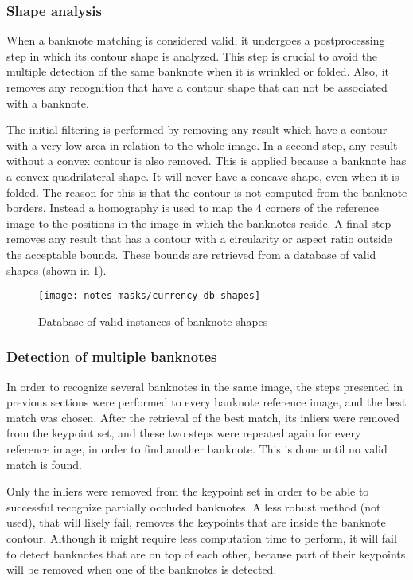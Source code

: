 \subsubsection{Shape analysis}\label{sec:shape-analysis}

When a banknote matching is considered valid, it undergoes a postprocessing step in which its contour shape is analyzed. This step is crucial to avoid the multiple detection of the same banknote when it is wrinkled or folded. Also, it removes any recognition that have a contour shape that can not be associated with a banknote.

The initial filtering is performed by removing any result which have a contour with a very low area in relation to the whole image. In a second step, any result without a convex contour is also removed. This is applied because a banknote has a convex quadrilateral shape. It will never have a concave shape, even when it is folded. The reason for this is that the contour is not computed from the banknote borders. Instead a homography is used to map the 4 corners of the reference image to the positions in the image in which the banknotes reside. A final step removes any result that has a contour with a circularity or aspect ratio outside the acceptable bounds. These bounds are retrieved from a database of valid shapes (shown in \cref{fig:currency-db-shapes}).

\begin{figure}
	\centering
	\texttt{[image: notes-masks/currency-db-shapes]}
	\caption{Database of valid instances of banknote shapes}
	\label{fig:currency-db-shapes}
\end{figure}


\subsubsection{Detection of multiple banknotes}

In order to recognize several banknotes in the same image, the steps presented in previous sections were performed to every banknote reference image, and the best match was chosen. After the retrieval of the best match, its inliers were removed from the keypoint set, and these two steps were repeated again for every reference image, in order to find another banknote. This is done until no valid match is found.

Only the inliers were removed from the keypoint set in order to be able to successful recognize partially occluded banknotes. A less robust method (not used), that will likely fail, removes the keypoints that are inside the banknote contour. Although it might require less computation time to perform, it will fail to detect banknotes that are on top of each other, because part of their keypoints will be removed when one of the banknotes is detected.
